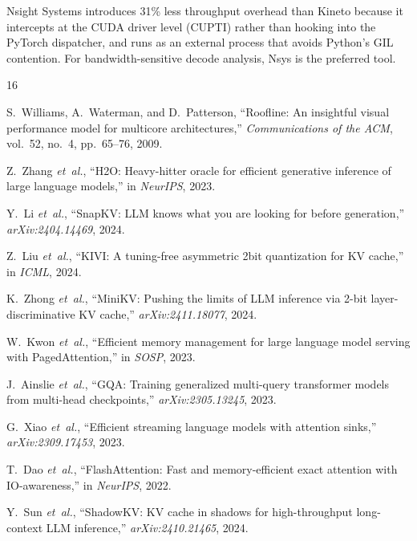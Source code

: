 \documentclass[conference]{IEEEtran}
\begin{document}
Nsight Systems introduces 31\% less throughput overhead than Kineto because it intercepts at the CUDA driver level (CUPTI) rather than hooking into the PyTorch dispatcher, and runs as an external process that avoids Python's GIL contention. For bandwidth-sensitive decode analysis, Nsys is the preferred tool.




\begin{thebibliography}{16}

S.~Williams, A.~Waterman, and D.~Patterson, ``Roofline: An insightful visual performance model for multicore architectures,'' \textit{Communications of the ACM}, vol.~52, no.~4, pp.~65--76, 2009.

Z.~Zhang \textit{et~al.}, ``H2O: Heavy-hitter oracle for efficient generative inference of large language models,'' in \textit{NeurIPS}, 2023.

Y.~Li \textit{et~al.}, ``SnapKV: LLM knows what you are looking for before generation,'' \textit{arXiv:2404.14469}, 2024.

Z.~Liu \textit{et~al.}, ``KIVI: A tuning-free asymmetric 2bit quantization for KV cache,'' in \textit{ICML}, 2024.

K.~Zhong \textit{et~al.}, ``MiniKV: Pushing the limits of LLM inference via 2-bit layer-discriminative KV cache,'' \textit{arXiv:2411.18077}, 2024.

W.~Kwon \textit{et~al.}, ``Efficient memory management for large language model serving with PagedAttention,'' in \textit{SOSP}, 2023.

J.~Ainslie \textit{et~al.}, ``GQA: Training generalized multi-query transformer models from multi-head checkpoints,'' \textit{arXiv:2305.13245}, 2023.

G.~Xiao \textit{et~al.}, ``Efficient streaming language models with attention sinks,'' \textit{arXiv:2309.17453}, 2023.

T.~Dao \textit{et~al.}, ``FlashAttention: Fast and memory-efficient exact attention with IO-awareness,'' in \textit{NeurIPS}, 2022.

Y.~Sun \textit{et~al.}, ``ShadowKV: KV cache in shadows for high-throughput long-context LLM inference,'' \textit{arXiv:2410.21465}, 2024.


\end{thebibliography}
\end{document}
